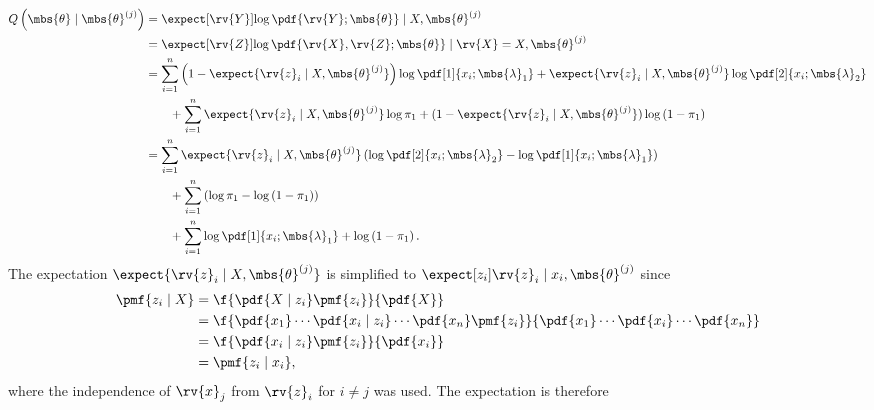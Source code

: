 \documentclass{tufte-handout}
\begin{document}
    \begin{align}
        Q\left(\mbs{\theta}\mid\mbs{\theta}^{(j)}\right) 
        &= \expect[\rv{Y}]{\log \pdf{\rv{Y} ; \mbs{\theta}} \mid X, \mbs{\theta}^{(j)}}\\
        &= \expect[\rv{Z}]{\log \pdf{\rv{X}, \rv{Z} ; \mbs{\theta}} \mid \rv{X}=X, \mbs{\theta}^{(j)}}\\
        &=
        \label{eq:Qtheta|thetaJ: split in params}
        \sum_{i=1}^{n} \left(1-\expect{\rv{z}_{i}\mid X, \mbs{\theta}^{(j)}}\right) \log \pdf[1]{{x}_{i}; \mbs{\lambda}_{1}} + \expect{\rv{z}_{i}\mid X, \mbs{\theta}^{(j)}}\log\pdf[2]{{x}_{i}; \mbs{\lambda}_{2}}
        \nonumber\\&\qquad
        +\sum_{i=1}^{n}\expect{\rv{z}_{i}\mid X, \mbs{\theta}^{(j)}}\log \pi_{1} + (1-\expect{\rv{z}_{i}\mid X, \mbs{\theta}^{(j)}})\log\left( 1-\pi_{1} \right)\\
        &=
        \sum_{i=1}^{n} \expect{\rv{z}_{i}\mid X, \mbs{\theta}^{(j)}} \left( 
            \log\pdf[2]{{x}_{i}; \mbs{\lambda}_{2}}
            -\log \pdf[1]{{x}_{i}; \mbs{\lambda}_{1}}
        \right)
        \nonumber\\&\qquad  
        +\sum_{i=1}^{n}
            \left(
                \log \pi_{1} 
                -\log\left( 1-\pi_{1}\right) 
            \right)
        \nonumber\\&\qquad        
        +\sum_{i=1}^{n} 
            \log \pdf[1]{{x}_{i}; \mbs{\lambda}_{1}} +
            \log\left( 1-\pi_{1}\right).
    \end{align}
    The expectation $\expect{\rv{z}_{i} \mid X, \mbs{\theta}^{(j)}}$ is simplified to $\expect[z_{i}]{\rv{z}_{i} \mid x_{i}, \mbs{\theta}^{(j)}}$ 
    since
    \begin{align}
        \pmf{z_{i}\mid X} 
        &= \f{\pdf{X \mid z_{i}}\pmf{z_{i}}}{\pdf{X}}\\
        &= \f{\pdf{x_{1}}\cdots\pdf{x_{i}\mid z_{i}}\cdots \pdf{x_{n}} \pmf{z_{i}}}{\pdf{x_{1}}\cdots\pdf{x_{i}}\cdots\pdf{x_{n}}}\\
        &= \f{\pdf{x_{i}\mid z_{i}}\pmf{z_{i}}}{\pdf{x_{i}}}\\
        &= \pmf{z_{i}\mid x_{i}},
    \end{align}
    where the independence of $\rv{x}_{j}$ from $\rv{z}_{i}$ for $i\neq j$ was used.
    The expectation is therefore
\end{document}
